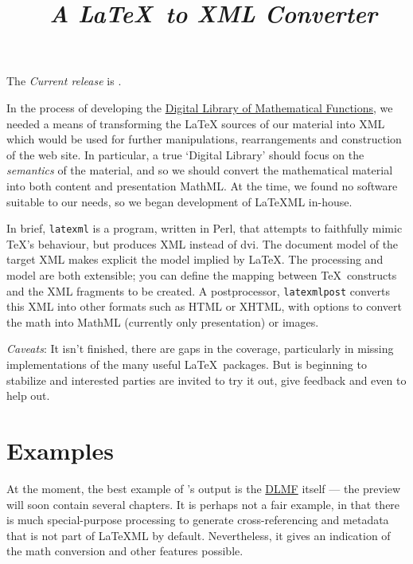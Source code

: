 \documentclass{article}
\title{\LaTeXML\ \emph{A \LaTeX\ to XML Converter}}
\begin{document}
\maketitle

The \emph{Current release} is .

In the process of developing the
\href{http://dlmf.nist.gov/}{Digital Library of Mathematical Functions},
we needed a means of transforming
the LaTeX sources of our material into XML which would be used
for further manipulations, rearrangements and construction of the web site.
In particular, a true `Digital Library' should focus on the \emph{semantics}
of the material, and so we should convert the mathematical material into both
content and presentation MathML.
At the time, we found no software suitable to our needs, so we began
development of LaTeXML in-house.  

In brief, \texttt{latexml} is a program, written in Perl, that attempts to
faithfully mimic \TeX's behaviour, but produces XML instead of dvi.
The document model of the target XML makes explicit the model implied
by \LaTeX.
The processing and model are both extensible; you can define
the mapping between \TeX\ constructs and the XML fragments to be created.
A postprocessor, \texttt{latexmlpost} converts this
XML into other formats such as HTML or XHTML, with options
to convert the math into MathML (currently only presentation) or images.

\emph{Caveats}: It isn't finished, there are gaps in the coverage,
particularly in missing implementations of the many useful \LaTeX\ packages.
But is beginning to stabilize and interested parties
are invited to try it out, give feedback and even to help out.


\section{Examples}\label{examples}
At the moment, the best example of \LaTeXML's output is 
the \href{http://dlmf.nist.gov/}{DLMF} itself
--- the preview  will soon contain several chapters.
It is perhaps not a fair example, in that there is much
special-purpose processing to generate cross-referencing and metadata that is not
part of LaTeXML by default. Nevertheless, it gives an indication of the
math conversion and other features possible.
\end{document}

